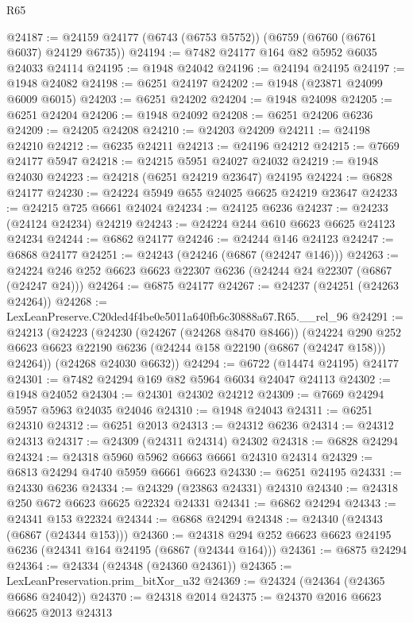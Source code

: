 \begin{lexlean}{R65}
\begin{coremodule}
{@24187 := @24159 @24177 (@6743 (@6753 @5752)) (@6759 (@6760 (@6761 @6037) @24129 @6735))
@24194 := @7482 @24177 @164 @82 @5952 @6035 @24033 @24114
@24195 := @1948 @24042
@24196 := @24194 @24195
@24197 := @1948 @24082
@24198 := @6251 @24197
@24202 := @1948 (@23871 @24099 @6009 @6015)
@24203 := @6251 @24202
@24204 := @1948 @24098
@24205 := @6251 @24204
@24206 := @1948 @24092
@24208 := @6251 @24206 @6236
@24209 := @24205 @24208
@24210 := @24203 @24209
@24211 := @24198 @24210
@24212 := @6235 @24211
@24213 := @24196 @24212
@24215 := @7669 @24177 @5947
@24218 := @24215 @5951 @24027 @24032
@24219 := @1948 @24030
@24223 := @24218 (@6251 @24219 @23647) @24195
@24224 := @6828 @24177
@24230 := @24224 @5949 @655 @24025 @6625 @24219 @23647
@24233 := @24215 @725 @6661 @24024
@24234 := @24125 @6236
@24237 := @24233 (@24124 @24234) @24219
@24243 := @24224 @244 @610 @6623 @6625 @24123 @24234
@24244 := @6862 @24177
@24246 := @24244 @146 @24123
@24247 := @6868 @24177
@24251 := @24243 (@24246 (@6867 (@24247 @146)))
@24263 := @24224 @246 @252 @6623 @6623 @22307 @6236 (@24244 @24 @22307 (@6867 (@24247 @24)))
@24264 := @6875 @24177
@24267 := @24237 (@24251 (@24263 @24264))
@24268 := LexLeanPreserve.C20ded4f4be0e5011a640fb6c30888a67.R65.__rel_96
@24291 := @24213
    (@24223
      (@24230
        (@24267 (@24268 @8470 @8466))
        (@24224
          @290
          @252
          @6623
          @6623
          @22190
          @6236
          (@24244 @158 @22190 (@6867 (@24247 @158)))
          @24264))
      (@24268 @24030 @6632))
@24294 := @6722 (@14474 @24195) @24177
@24301 := @7482 @24294 @169 @82 @5964 @6034 @24047 @24113
@24302 := @1948 @24052
@24304 := @24301 @24302 @24212
@24309 := @7669 @24294 @5957 @5963 @24035 @24046
@24310 := @1948 @24043
@24311 := @6251 @24310
@24312 := @6251 @2013
@24313 := @24312 @6236
@24314 := @24312 @24313
@24317 := @24309 (@24311 @24314) @24302
@24318 := @6828 @24294
@24324 := @24318 @5960 @5962 @6663 @6661 @24310 @24314
@24329 := @6813 @24294 @4740 @5959 @6661 @6623
@24330 := @6251 @24195
@24331 := @24330 @6236
@24334 := @24329 (@23863 @24331) @24310
@24340 := @24318 @250 @672 @6623 @6625 @22324 @24331
@24341 := @6862 @24294
@24343 := @24341 @153 @22324
@24344 := @6868 @24294
@24348 := @24340 (@24343 (@6867 (@24344 @153)))
@24360 := @24318 @294 @252 @6623 @6623 @24195 @6236 (@24341 @164 @24195 (@6867 (@24344 @164)))
@24361 := @6875 @24294
@24364 := @24334 (@24348 (@24360 @24361))
@24365 := LexLeanPreservation.prim_bitXor_u32
@24369 := @24324 (@24364 (@24365 @6686 @24042))
@24370 := @24318 @2014
@24375 := @24370 @2016 @6623 @6625 @2013 @24313
}
\end{coremodule}
\end{lexlean}
